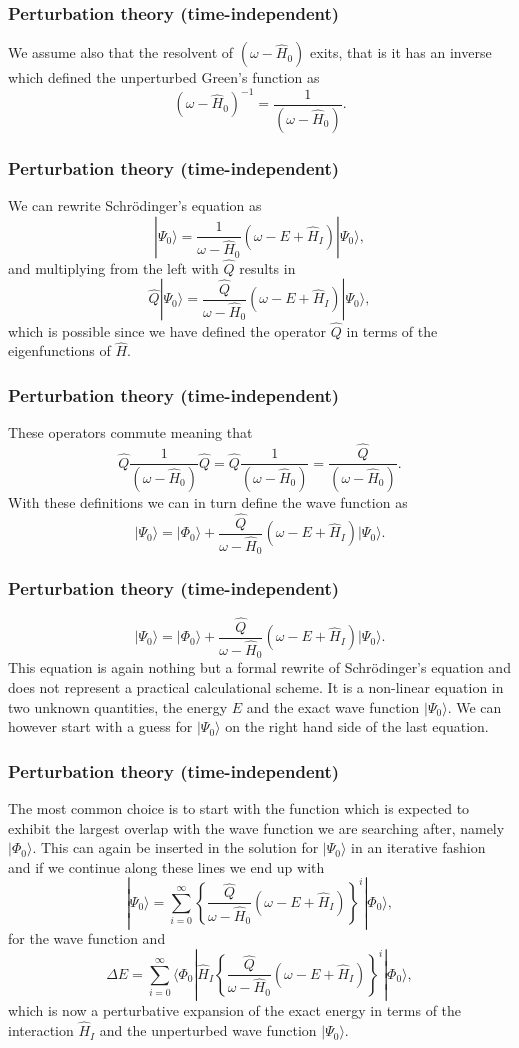 \frame
{
\frametitle{Perturbation theory (time-independent)}
\begin{small}
{\scriptsize
We assume also that the resolvent of $\left(\omega-\hat{H}_0\right)$ exits, that is
it has an inverse which defined the unperturbed Green's function as
\[
\left(\omega-\hat{H}_0\right)^{-1}=\frac{1}{\left(\omega-\hat{H}_0\right)}.
\]

}
\end{small}
}


\frame
{
\frametitle{Perturbation theory (time-independent)}
\begin{small}
{\scriptsize
We can rewrite Schr\"odinger's equation as
\[
|\Psi_0\rangle=\frac{1}{\omega-\hat{H}_0}\left(\omega-E+\hat{H}_I\right)|\Psi_0\rangle,
\]
and multiplying from the left with $\hat{Q}$ results in
\[
\hat{Q}|\Psi_0\rangle=\frac{\hat{Q}}{\omega-\hat{H}_0}\left(\omega-E+\hat{H}_I\right)|\Psi_0\rangle,
\]
which is possible since we have defined the operator $\hat{Q}$ in terms of the eigenfunctions of $\hat{H}$.
}
\end{small}
}


\frame
{
\frametitle{Perturbation theory (time-independent)}
\begin{small}
{\scriptsize
 These operators commute meaning that
\[
\hat{Q}\frac{1}{\left(\omega-\hat{H}_0\right)}\hat{Q}=\hat{Q}\frac{1}{\left(\omega-\hat{H}_0\right)}=\frac{\hat{Q}}{\left(\omega-\hat{H}_0\right)}.
\]
With these definitions we can in turn define the wave function as 
\[
|\Psi_0\rangle=|\Phi_0\rangle+\frac{\hat{Q}}{\omega-\hat{H}_0}\left(\omega-E+\hat{H}_I\right)|\Psi_0\rangle.
\]
}
\end{small}
}


\frame
{
\frametitle{Perturbation theory (time-independent)}
\begin{small}
{\scriptsize
\[
|\Psi_0\rangle=|\Phi_0\rangle+\frac{\hat{Q}}{\omega-\hat{H}_0}\left(\omega-E+\hat{H}_I\right)|\Psi_0\rangle.
\]
This equation is again nothing but a formal rewrite of Schr\"odinger's equation
and does not represent a practical calculational scheme.  
It is a non-linear equation in two unknown quantities, the energy $E$ and the exact
wave function $|\Psi_0\rangle$. We can however start with a guess for $|\Psi_0\rangle$ on the right hand side of the last equation.
}
\end{small}
}
\frame
{
\frametitle{Perturbation theory (time-independent)}
\begin{small}
{\scriptsize
 The most common choice is to start with the function which is expected to exhibit the largest overlap with the wave function we are searching after, namely $|\Phi_0\rangle$. This can again be inserted in the solution for $|\Psi_0\rangle$ in an iterative fashion and if we continue along these lines we end up with
\[
|\Psi_0\rangle=\sum_{i=0}^{\infty}\left\{\frac{\hat{Q}}{\omega-\hat{H}_0}\left(\omega-E+\hat{H}_I\right)\right\}^i|\Phi_0\rangle, 
\]
for the wave function and
\[
\Delta E=\sum_{i=0}^{\infty}\langle \Phi_0|\hat{H}_I\left\{\frac{\hat{Q}}{\omega-\hat{H}_0}\left(\omega-E+\hat{H}_I\right)\right\}^i|\Phi_0\rangle, 
\]
which is now  a perturbative expansion of the exact energy in terms of the interaction
$\hat{H}_I$ and the unperturbed wave function $|\Psi_0\rangle$.
}
\end{small}
}


